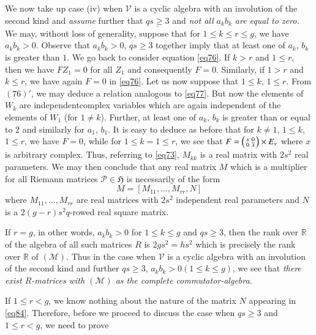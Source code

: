 We now take up case (iv) when $\mathscr{V}$ is a cyclic algebra with
an involution of the second kind and {\em assume} further that
$\underline{qs\geq 3}$ and {\em not all $a_{k}b_{k}$ are equal to
  zero.} We may, without loss of generality, suppose that for $1\leq
k\leq r\leq g$, we have $a_{k}b_{k}>0$. Observe that $a_{k}b_{k}>0$,
$qs\geq 3$ together imply that at least one of $a_{k}$, $b_{k}$ is
greater than $1$. We go back to consider equation \eqref{eq76}. If $k>r$
and $1\leq r$, then we have $FZ_{1}=0$ for all $Z_{1}$ and
consequently $F=0$. Similarly, if $1>r$ and $k\leq r$, we have again
$F=0$ in \eqref{eq76}. Let us now suppose that $1\leq k$, $1\leq
r$. From $(76)'$, we may deduce a relation analogous to
\eqref{eq77}. But now the elements of $W_{k}$ are
independent\pageoriginale complex variables which are again
independent of the elements of $W_{1}$ (for $1\neq k$). Further, at
least one of $a_{k}$, $b_{k}$ is greater than or equal to $2$ and
similarly for $a_{1}$, $b_{1}$. It is easy to deduce as before that
for $k\neq 1$, $1\leq k$, $1\leq r$, we have $F=0$, while for $1\leq
k=1\leq r$, we see that $F=\left(\begin{smallmatrix} x & 0\\ 0 &
  \overline{x}
\end{smallmatrix}\right)\times E_{\nu}$ where $x$ is arbitrary
complex. Thus, referring to \eqref{eq73}, $M_{kk}$ is a real matrix with
$2s^{2}$ real parameters. We may then conclude that any real matrix
$M$ which is a multiplier for all Riemann matrices
$\mathscr{P}\in\mathfrak{H}$ is necessarily of the form
\begin{equation*}
M=[M_{11},\ldots,M_{rr},N]\tag{84}\label{eq84}
\end{equation*}
where $M_{11},\ldots,M_{rr}$ are real matrices with $2s^{2}$
independent real parameters and $N$ is a $2(g-r)s^{2}q$-rowed real
square matrix.

If $r=g$, in other words, $a_{k}b_{k}>0$ for $1\leq k\leq g$ and
$qs\geq 3$, then the rank over $\mathbb{R}$ of the algebra of all such
matrices $R$ is $2gs^{2}=hs^{2}$ which is precisely the rank over
$\mathbb{R}$ of $(\mathscr{M})$. Thus in the case when $\mathscr{V}$
is a cyclic algebra with an involution of the second kind and further
$qs\geq 3$, $a_{k}b_{k}>0(1\leq k\leq g)$, we see that {\em there
  exist $R$-matrices with $(\mathscr{M})$ as the complete
  commutator-algebra.}

If $1\leq r<g$, we know nothing about the nature of the matrix $N$
appearing in \eqref{eq84}. Therefore, before we proceed to discuss the
case when $qs\geq 3$ and $1\leq r<g$, we need to prove

